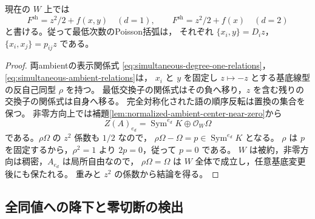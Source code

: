 \begin{lemma}[対称化した中心方程式の偶性]
\label{lem:shadow-even-z}
現在の $W$ 上では
\[
 F^{\mathrm{sh}}=z^2/2+f(x,y)\quad(d=1),\qquad
 F^{\mathrm{sh}}=z^2/2+f(x)\quad(d=2)
\]
と書ける。従って最低次数のPoisson括弧は，
それぞれ $\{x_i,y\}=D_i z$，$\{x_i,x_j\}=p_{ij}z$ である。
\end{lemma}
\begin{proof}
両ambientの表示関係式
\eqref{eq:simultaneous-degree-one-relations}，
\eqref{eq:simultaneous-ambient-relations}は，
$x_i$ と $y$ を固定し $z\mapsto-z$ とする基底線型の反自己同型 $\rho$ を持つ。
最低交換子の関係式はその負へ移り，$z$ を含む残りの交換子の関係式は自身へ移る。
完全対称化された語の順序反転は置換の集合を保つ。
非零方向上では補題\ref{lem:normalized-ambient-center-near-zero}から
\[
 Z(A)_{e_d}=\operatorname{Sym}^{e_d}K\oplus\mathcal O_W\Omega
\]
である。$\rho\Omega$ の $z^2$ 係数も $1/2$ なので，
$\rho\Omega-\Omega=p\in\operatorname{Sym}^{e_d}K$ となる。
$\rho$ は $p$ を固定するから，$\rho^2=1$ より $2p=0$，従って $p=0$ である。
$W$ は被約，非零方向は稠密，$A_{e_d}$ は局所自由なので，
$\rho\Omega=\Omega$ は $W$ 全体で成立し，任意基底変更後にも保たれる。
重みと $z^2$ の係数から結論を得る。
\end{proof}

\subsection{全同値への降下と零切断の検出}

